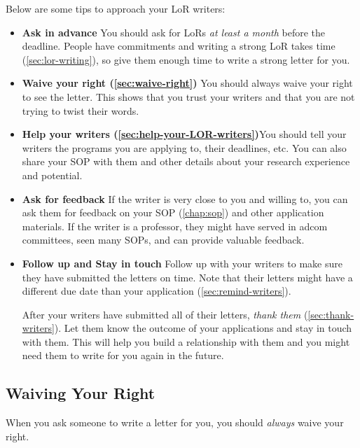 \documentclass[oneside,11pt,dvipsnames]{book}
\begin{document}
Below are some tips to approach your LoR writers:
\begin{itemize}
\item \textbf{Ask in advance} You should ask for LoRs \emph{at least a month} before the deadline. People have commitments and writing a strong LoR takes time (\autoref{sec:lor-writing}), so give them enough time to write a strong letter for you.

\item \textbf{Waive your right (\autoref{sec:waive-right})} You should always waive your right to see the letter. This shows that you trust your writers and that you are not trying to twist their words.

\item \textbf{Help your writers (\autoref{sec:help-your-LOR-writers})}You should tell your writers the programs you are applying to, their deadlines, etc.  You can also share your SOP with them and other details about your research experience and potential. 




\item \textbf{Ask for feedback} If the writer is very close to you and willing to, you can ask them for feedback on your SOP (\autoref{chap:sop}) and other application materials. If the writer is a professor, they might have served in adcom committees, seen many SOPs, and can provide valuable feedback.

\item \textbf{Follow up and Stay in touch} Follow up with your writers to make sure they have submitted the letters on time. Note that their letters might have a different due date than your application (\autoref{sec:remind-writers}). 

After your writers have submitted all of their letters, \emph{thank them} (\autoref{sec:thank-writers}).  Let them know the outcome of your applications and stay in touch with them.  This will help you build a relationship with them and you might need them to write for you again in the future.
\end{itemize}



\subsection{Waiving Your Right}\label{sec:waive-right}

When you ask someone to write a letter for you, you should \emph{always} waive your right.
\end{document}
